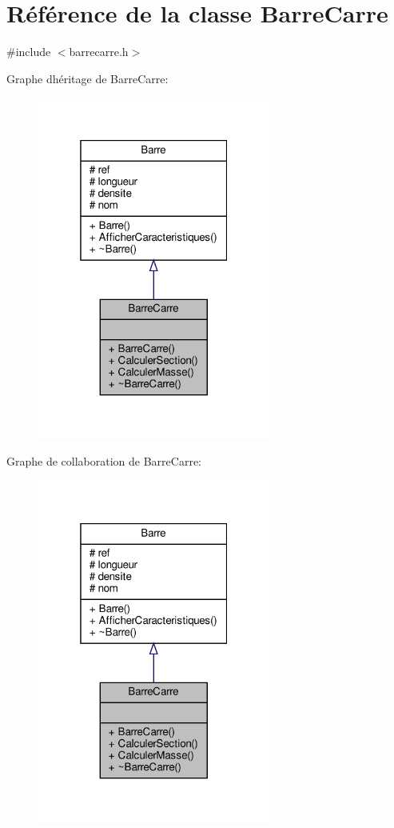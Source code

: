 \hypertarget{class_barre_carre}{}\section{Référence de la classe Barre\+Carre}
\label{class_barre_carre}


{\ttfamily \#include $<$barrecarre.\+h$>$}



Graphe d\textquotesingle{}héritage de Barre\+Carre\+:
\nopagebreak
\begin{figure}[H]
\begin{center}
\leavevmode
\includegraphics[width=217pt]{class_barre_carre__inherit__graph}
\end{center}
\end{figure}


Graphe de collaboration de Barre\+Carre\+:
\nopagebreak
\begin{figure}[H]
\begin{center}
\leavevmode
\includegraphics[width=217pt]{class_barre_carre__coll__graph}
\end{center}
\end{figure}
